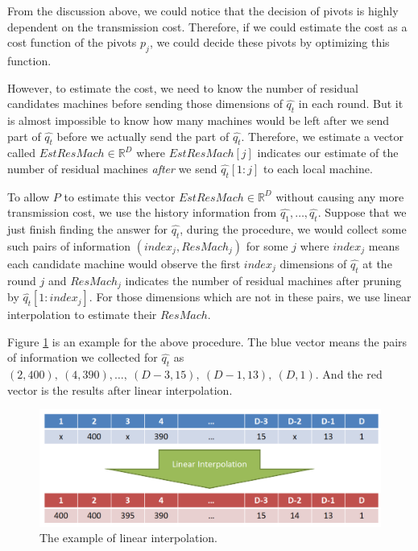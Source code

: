 From the discussion above, we could notice that the decision of pivots is highly dependent on the transmission cost.  Therefore, if we could estimate the cost as a cost function of the pivots $p_j$, we could decide these pivots by optimizing this function.

However, to estimate the cost, we need to know the number of residual candidates machines before sending those dimensions of $\hat{q_t}$ in each round.  But it is almost impossible to know how many machines would be left after we send part of $\hat{q_t}$ before we actually send the part of $\hat{q_t}$.  Therefore, we estimate a vector called $EstResMach \in\mathbb{R}^D$ where $EstResMach[j]$ indicates our estimate of the number of residual machines \emph{after} we send $\hat{q_t}[1:j]$ to each local machine.  

To allow $P$ to  estimate this vector $EstResMach\in\mathbb{R}^D$ without causing any more transmission cost, we use the history information from $\hat{q_1},\ldots,\hat{q_t}$.  Suppose that we just finish finding the answer for $\hat{q_t}$, during the procedure, we would collect some such pairs of information $(index_j, ResMach_j)$ for some $j$ where $index_j$ means each candidate machine would observe the first $index_j$ dimensions of $\hat{q_t}$ at the round $j$ and $ResMach_j$ indicates the number of residual machines after pruning by $\hat{q_t}[1:index_j]$.  For those dimensions which are not in these pairs, we use linear interpolation to estimate their $ResMach$.  

Figure \ref{fig:LI} is an example for the above procedure.  The blue vector means the pairs of information we collected for $\hat{q_t}$ as $(2,400),~(4,390),\ldots,~(D-3,15),~(D-1,13),~(D,1)$.  And the red vector is the results after linear interpolation.

\begin{figure}[htpb!]
  \centering
    \includegraphics[width=1.0\textwidth]{fig/LI.png}
    \caption{\label{fig:LI}The example of linear interpolation.}
\end{figure}

